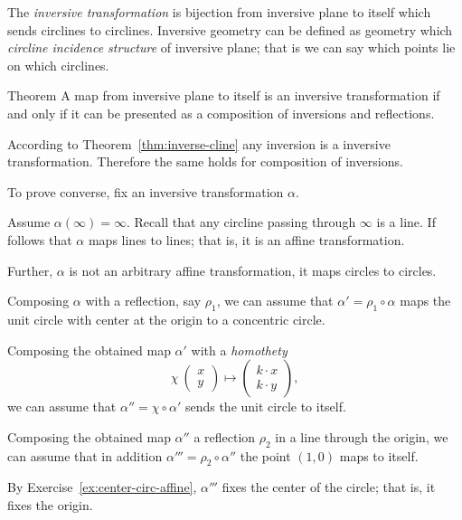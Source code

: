 The \emph{inversive transformation} is bijection from inversive plane to itself which sends circlines to circlines.
Inversive geometry can be defined as geometry which  {}\emph{circline incidence structure} of inversive plane;
that is we can say which points lie on which circlines.

\begin{thm}{Theorem}\label{thm:inversions-inversive}
A map from inversive plane to itself is an inversive transformation
if and only if it can be presented as a composition of inversions and reflections.  
\end{thm}

According to Theorem~\ref{thm:inverse-cline} any inversion is a inversive transformation.
Therefore the same holds for composition of inversions.

To prove converse, 
fix an inversive transformation $\alpha$.

Assume $\alpha(\infty)=\infty$.
Recall that any circline passing through $\infty$ is a line.
If follows that $\alpha$ maps lines to lines;
that is,
it is an affine transformation.

Further, $\alpha$ is not an arbitrary affine transformation,
it maps circles to circles.

Composing $\alpha$ with a reflection, say $\rho_1$, we can assume that $\alpha'=\rho_1\circ\alpha$ maps the unit circle with center at the origin to a concentric circle. 

Composing the obtained map $\alpha'$ with a {}\emph{homothety} 
\[\chi\:\left(\begin{smallmatrix}
x\\ y
\end{smallmatrix} \right)\mapsto \left(\begin{smallmatrix}
k\cdot x\\ k\cdot y
\end{smallmatrix} \right),\]
we can assume that $\alpha''=\chi\circ\alpha'$ sends the unit circle to itself.


Composing the obtained map $\alpha''$
 a reflection $\rho_2$ in a line through the origin,
we can assume that in addition $\alpha'''=\rho_2\circ\alpha''$ the point $(1,0)$ maps to itself.

By Exercise~\ref{ex:center-circ-affine},
$\alpha'''$ fixes the center of the circle;
that is, it fixes the origin.

